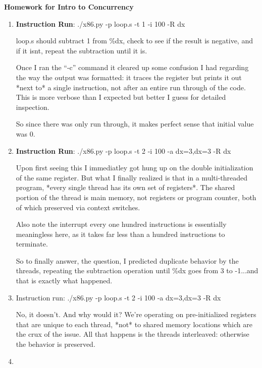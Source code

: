 \documentclass{article}
\begin{document}
\noindent \textbf{Homework for Intro to Concurrency}  %


\begin{enumerate}

\item 
 
\textbf{Instruction Run}: ./x86.py -p loop.s -t 1 -i 100 -R dx

loop.s should subtract 1 from \%dx, check to see if the result is negative, and if it isnt, 
repeat the subtraction until it is.  

Once I ran the ``-c'' command it cleared up some confusion I had regarding the way the output
was formatted: it traces the register but prints it out *next to* a single instruction, not
after an entire run through of the code. This is more verbose than I expected but better
I guess for detailed inspection. 

So since there was only run through, it makes perfect sense that initial value was 0.

\item 

\textbf{Instruction Run}: ./x86.py -p loop.s -t 2 -i 100 -a dx=3,dx=3 -R dx

Upon first seeing this I immediatley got hung up on the double initialization of the same
register. But what I finally realized is that in a multi-threaded program, *every single 
thread has its own set of registers*. The shared portion of the thread is main memory, not 
registers or program counter, both of which preserved via context switches. 

Also note the interrupt every one hundred instructions is essentially meaningless here, as 
it takes far less than a hundred instructions to terminate. 

So to finally answer, the question, I predicted duplicate behavior by the threads, repeating
the subtraction operation until \%dx goes from 3 to -1...and that is exactly what happened.

\item 

Instruction run: ./x86.py -p loop.s -t 2 -i 100 -a dx=3,dx=3 -R dx

No, it doesn't. And why would it? We're operating on pre-initialized registers that are 
unique to each thread, *not* to shared memory locations which are the crux of the issue. All
that happens is the threads interleaved: otherwise the behavior is preserved. 

\item 


\end{enumerate}
\end{document}
